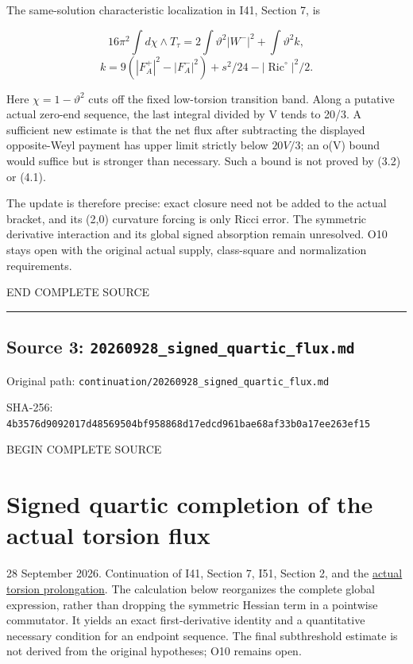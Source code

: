 \documentclass[
  10pt,
]{article}
\begin{document}
The same-solution characteristic localization in I41, Section 7, is

\[
 16\pi^2\int d\chi\wedge T_\tau
     =2\int\vartheta^2|W^-|^2+\int\vartheta^2 k,
\] \[
 k=9(|F_A^+|^2-|F_A^-|^2)+s^2/24
                                -|\operatorname{Ric}^{\circ}|^2/2.
\]

Here \(\chi=1-\vartheta^2\) cuts off the fixed low-torsion transition
band. Along a putative actual zero-end sequence, the last integral
divided by V tends to 20/3. A sufficient new estimate is that the net
flux after subtracting the displayed opposite-Weyl payment has upper
limit strictly below \(20V/3\); an o(V) bound would suffice but is
stronger than necessary. Such a bound is not proved by (3.2) or (4.1).

The update is therefore precise: exact closure need not be added to the
actual bracket, and its (2,0) curvature forcing is only Ricci error. The
symmetric derivative interaction and its global signed absorption remain
unresolved. O10 stays open with the original actual supply, class-square
and normalization requirements.

END COMPLETE SOURCE

\begin{center}\rule{0.5\linewidth}{0.5pt}\end{center}

\hypertarget{source-3-20260928_signed_quartic_flux.md}{%
\subsection{Source 3:
\nolinkurl{20260928_signed_quartic_flux.md}}\label{source-3-20260928_signed_quartic_flux.md}}

Original path: \nolinkurl{continuation/20260928_signed_quartic_flux.md}

SHA-256:
\nolinkurl{4b3576d9092017d48569504bf958868d17edcd961bae68af33b0a17ee263ef15}

BEGIN COMPLETE SOURCE

\hypertarget{signed-quartic-completion-of-the-actual-torsion-flux}{%
\section{Signed quartic completion of the actual torsion
flux}\label{signed-quartic-completion-of-the-actual-torsion-flux}}

28 September 2026. Continuation of I41, Section 7, I51, Section 2, and
the \href{20260928_actual_torsion_prolongation.md}{actual torsion
prolongation}. The calculation below reorganizes the complete global
expression, rather than dropping the symmetric Hessian term in a
pointwise commutator. It yields an exact first-derivative identity and a
quantitative necessary condition for an endpoint sequence. The final
subthreshold estimate is not derived from the original hypotheses; O10
remains open.
\end{document}
